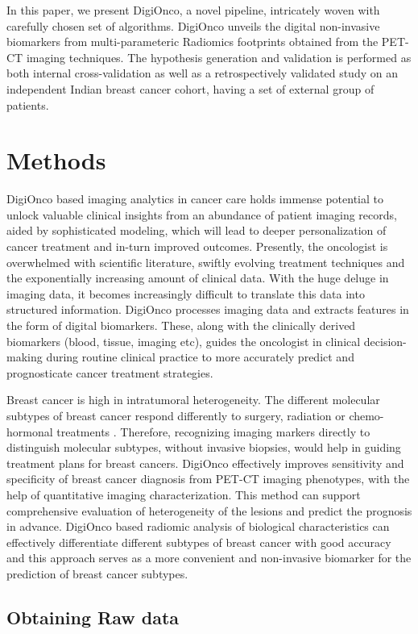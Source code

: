 \documentclass[final,1p,times,twocolumn]{elsarticle}
\begin{document}
In this paper, we present DigiOnco, a novel pipeline, intricately woven with carefully chosen set of algorithms. DigiOnco unveils the digital non-invasive biomarkers from multi-parameteric Radiomics footprints obtained from the PET-CT imaging techniques. The hypothesis generation and validation is performed as both internal cross-validation as well as a retrospectively validated study on an independent Indian breast cancer cohort, having a set of external group of patients. 


\section{Methods}
DigiOnco based imaging analytics in cancer care holds immense potential to unlock valuable clinical insights from an abundance of patient imaging records, aided by sophisticated modeling, which will lead to deeper personalization of cancer treatment and in-turn improved outcomes. Presently, the oncologist is overwhelmed with scientific literature, swiftly evolving treatment techniques and the exponentially increasing amount of clinical data. With the huge deluge in imaging data, it becomes increasingly difficult to translate this data into structured information. DigiOnco processes imaging data and extracts features in the form of digital biomarkers. These, along with the clinically derived biomarkers (blood, tissue, imaging etc), guides the oncologist in clinical decision-making during routine clinical practice to more accurately predict and prognosticate cancer treatment strategies. 

Breast cancer is high in intratumoral heterogeneity. The different molecular subtypes of breast cancer respond differently to surgery, radiation or chemo-hormonal treatments \cite{11}. Therefore, recognizing imaging markers directly to distinguish molecular subtypes, without invasive biopsies, would help in guiding treatment plans for breast cancers. DigiOnco effectively improves sensitivity and specificity of breast cancer diagnosis from PET-CT imaging phenotypes, with the help of quantitative imaging characterization. This method can support comprehensive evaluation of heterogeneity of the lesions and predict the prognosis in advance. DigiOnco based radiomic  analysis of  biological characteristics can effectively differentiate different subtypes of breast cancer with good accuracy and this approach serves as a more convenient and non-invasive biomarker for the prediction of breast cancer subtypes. 

\subsection{Obtaining Raw data}
\end{document}
